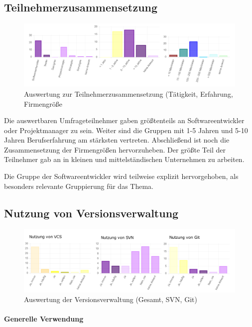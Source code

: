 \subsection{Teilnehmerzusammensetzung}

\begin{figure}[htbp]
  \includegraphics[width=\textwidth, height=\textheight, keepaspectratio]
    {resources/survey-participants.pdf}
  \caption{Auswertung zur Teilnehmerzusammensetzung (Tätigkeit, Erfahrung, Firmengröße}
\end{figure}
Die auswertbaren Umfrageteilnehmer gaben größtenteils an Softwareentwickler oder Projektmanager zu sein. Weiter sind die Gruppen mit 1-5 Jahren und 5-10 Jahren Berufserfahrung am stärksten vertreten. Abschließend ist noch die Zusammensetzung der Firmengrößen hervorzuheben. Der größte Teil der Teilnehmer gab an in kleinen und mittelständischen Unternehmen zu arbeiten.

Die Gruppe der Softwareentwickler wird teilweise explizit hervorgehoben, als besonders relevante Gruppierung für das Thema.

\subsection{Nutzung von Versionsverwaltung}

\begin{figure}[htbp]
  \includegraphics[width=\textwidth, height=\textheight, keepaspectratio]
    {resources/survey-vcs-usage.pdf}
  \caption{Auswertung der Versionsverwaltung (Gesamt, SVN, Git)}
\end{figure}

\paragraph{Generelle Verwendung}

